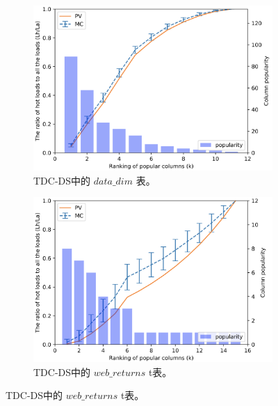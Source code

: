 \begin{figure}[]
    \centering
    \begin{minipage}[t]{0.5\textwidth}
        \begin{subfigure}[t]{1\textwidth}
            \centering
            \includegraphics[width=1\textwidth]{img/cw-cache/calc_date_dim}
            \caption{TDC-DS中的 $data\_dim$ 表。}
            \label{fig:calc-dd}
        \end{subfigure}%

        \begin{subfigure}[t]{1\textwidth}
            \centering
            \includegraphics[width=1\textwidth]{img/cw-cache/calc_web_returns}
            \caption{TDC-DS中的 $web\_returns$ t表。}
            \label{fig:calc-wr}
        \end{subfigure}%


\end{minipage}
\end{figure}
